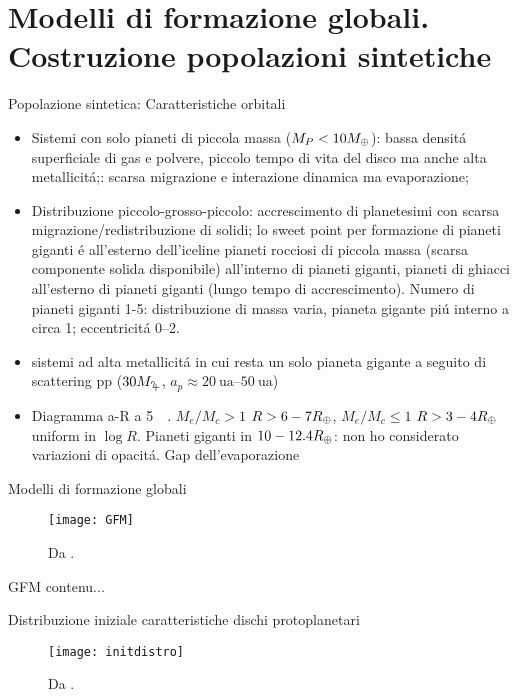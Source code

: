\section{Modelli di formazione globali. Costruzione popolazioni sintetiche}

\begin{wordonframe}{Popolazione sintetica: Caratteristiche orbitali}
\begin{itemize}
\item Sistemi con solo pianeti di piccola massa ($M_P<10M_{\oplus}{}$): bassa densit\'a superficiale di gas e polvere, piccolo tempo di vita del disco ma anche alta metallicit\'a;: scarsa migrazione e interazione dinamica ma evaporazione;
\item Distribuzione piccolo-grosso-piccolo: accrescimento di planetesimi con scarsa migrazione/redistribuzione di solidi; lo sweet point per formazione di pianeti giganti \'e all'esterno dell'iceline
pianeti rocciosi di piccola massa (scarsa componente solida disponibile) all'interno di pianeti giganti, pianeti di ghiacci all'esterno di pianeti giganti (lungo tempo di accrescimento).
Numero di pianeti giganti 1-5: distribuzione di massa varia, pianeta gigante pi\'u interno a circa \SI{1}{\astronmicalunit}; eccentricit\'a \numrange{0}{2}.
\item sistemi ad alta metallicit\'a in cui resta un solo pianeta gigante a seguito di scattering pp ($30\mjupiter{}$, $a_p\approx\SIrange{20}{50}{\astronomicalunit}$)
\item Diagramma a-R a \SI{5}{\giga\year}. $M_e/M_c>1$ $R>6-7R_{\oplus}{}$, $M_e/M_c\leq1$ $R>3-4R_{\oplus}{}$ uniform in $\log{R}$.
Pianeti giganti in $10-12.4R_{\oplus}{}$: non ho considerato variazioni di opacit\'a. Gap dell'evaporazione
\end{itemize}
\end{wordonframe}

\begin{frame}{Modelli di formazione globali}
\begin{figure}[!ht]
	\texttt{[image: GFM]}
	\caption{Da \cite{benz2014planet}.}\label{fig:GFM}
\end{figure}
\end{frame}

\begin{wordonframe}{GFM}
contenu...
\end{wordonframe}

\begin{frame}{Distribuzione iniziale caratteristiche dischi protoplanetari}
	\begin{figure}[!ht]
		\texttt{[image: initdistro]}
		\caption{Da \cite{mordasini2018planetary}.}\label{fig:initdistro}
	\end{figure}
\end{frame}

